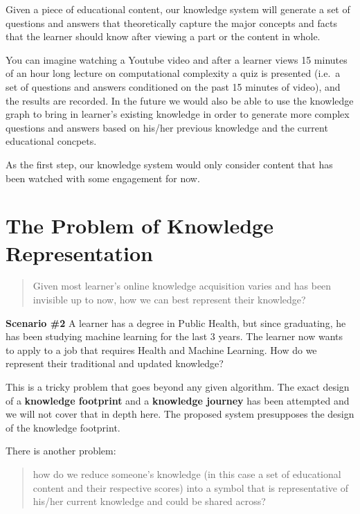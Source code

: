 \documentclass[]{book}
\theoremstyle{definition}
\theoremstyle{definition}
\theoremstyle{definition}
\theoremstyle{remark}
\begin{document}
Given a piece of educational content, our knowledge system will generate
a set of questions and answers that theoretically capture the major
concepts and facts that the learner should know after viewing a part or
the content in whole.

You can imagine watching a Youtube video and after a learner views 15
minutes of an hour long lecture on computational complexity a quiz is
presented (i.e.~a set of questions and answers conditioned on the past
15 minutes of video), and the results are recorded. In the future we
would also be able to use the knowledge graph to bring in learner's
existing knowledge in order to generate more complex questions and
answers based on his/her previous knowledge and the current educational
concpets.

As the first step, our knowledge system would only consider content that
has been watched with some engagement for now.

\section{The Problem of Knowledge
Representation}\label{the-problem-of-knowledge-representation}

\begin{quote}
Given most learner's online knowledge acquisition varies and has been
invisible up to now, how we can best represent their knowledge?
\end{quote}

\textbf{Scenario \#2} A learner has a degree in Public Health, but since
graduating, he has been studying machine learning for the last 3 years.
The learner now wants to apply to a job that requires Health and Machine
Learning. How do we represent their traditional and updated knowledge?

This is a tricky problem that goes beyond any given algorithm. The exact
design of a \textbf{knowledge footprint} and a \textbf{knowledge
journey} has been attempted and we will not cover that in depth here.
The proposed system presupposes the design of the knowledge footprint.

There is another problem:

\begin{quote}
how do we reduce someone's knowledge (in this case a set of educational
content and their respective scores) into a symbol that is
representative of his/her current knowledge and could be shared across?
\end{quote}
\end{document}
